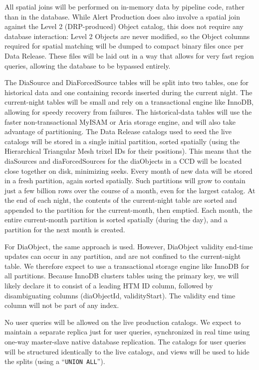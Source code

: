\documentclass[DM,lsstdraft,toc]{lsstdoc}
\begin{document}
All spatial joins will be performed on in-memory data by pipeline code,
rather than in the database. While Alert Production does also involve a
spatial join against the Level 2 (DRP-produced) Object catalog, this
does not require any database interaction: Level 2 Objects are never
modified, so the Object columns required for spatial matching will be
dumped to compact binary files once per Data Release. These files will
be laid out in a way that allows for very fast region queries, allowing
the database to be bypassed entirely.

The DiaSource and DiaForcedSource tables will be split into two tables,
one for historical data and one containing records inserted during the
current night. The current-night tables will be small and rely on a
transactional engine like InnoDB, allowing for speedy recovery from
failures. The historical-data tables will use the faster
non-transactional MyISAM or Aria storage engine, and will also take
advantage of partitioning. The Data Release catalogs used to seed the
live catalogs will be stored in a single initial partition, sorted
spatially (using the Hierarchical Triangular Mesh trixel IDs for their
positions). This means that the diaSources and diaForcedSources for the
diaObjects in a CCD will be located close together on disk, minimizing
seeks. Every month of new data will be stored in a fresh partition,
again sorted spatially. Such partitions will grow to contain just a few
billion rows over the course of a month, even for the largest catalog.
At the end of each night, the contents of the current-night table are
sorted and appended to the partition for the current-month, then
emptied. Each month, the entire current-month partition is sorted
spatially (during the day), and a partition for the next month is
created.

For DiaObject, the same approach is used. However, DiaObject validity
end-time updates can occur in any partition, and are not confined to the
current-night table. We therefore expect to use a transactional storage
engine like InnoDB for all partitions. Because InnoDB clusters tables
using the primary key, we will likely declare it to consist of a leading
HTM ID column, followed by disambiguating columns (diaObjectId,
validityStart). The validity end time column will not be part of any
index.

No user queries will be allowed on the live production catalogs. We
expect to maintain a separate replica just for user queries,
synchronized in real time using one-way master-slave native database
replication. The catalogs for user queries will be structured
identically to the live catalogs, and views will be used to hide the
splits (using a ``\texttt{UNION\ ALL}'').
\end{document}
